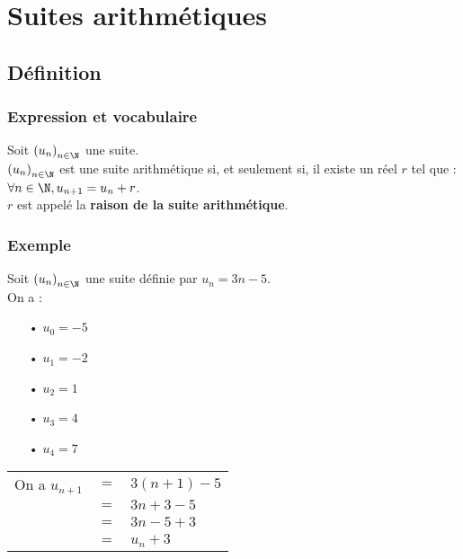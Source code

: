 \newpage

\section{Suites arithmétiques}

\subsection{Définition}

\subsubsection{Expression et vocabulaire}

Soit $\left(u_n\right)_{n \in \N}$ une suite. \\

$\left(u_n\right)_{n \in \N}$ est une suite arithmétique si, et seulement si, il existe un réel $r$ tel que : \\
$\forall n \in \N, u_{n+1} = u_n + r$. \\

$r$ est appelé la \textbf{raison de la suite arithmétique}. 

\subsubsection{Exemple}
Soit $\left(u_n\right)_{n \in \N}$ une suite définie par $u_n = 3n - 5$. \\

On a : 

\begin{itemize}
\item[•] $u_0 = -5$
\item[•] $u_1 = -2$
\item[•] $u_2 = 1$
\item[•] $u_3 = 4$
\item[•] $u_4 = 7$
\end{itemize}

\vspace*{.3cm}

\begin{tabular}{lll}
On a $u_{n+1}$ & $ = $ & $ 3\left(n+1\right)-5$ \\
& $=$ & $3n + 3 - 5$ \\
& $=$ & $3n - 5 + 3$ \\
& $=$ & $u_n + 3$ \\
\end{tabular}

